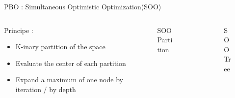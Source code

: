 \begin{frame}{PBO : Simultaneous Optimistic Optimization(SOO)}
    \begin{columns}[b]
        \begin{column}{0.4\textwidth}
            \begin{block}{Principe :}
                \begin{itemize}
                    \item K-inary partition of the space
                    \item Evaluate the center of each partition
                    \item Expand a maximum of one node by iteration / by depth
                \end{itemize}
            \end{block}\vspace*{35pt}
            
        \end{column}    

        \begin{column}[b]{0.27\textwidth}
            \begin{figure}[h]
                \centering
                \resizebox{\textwidth}{!}{
                    
                }
                \caption{SOO Partition}
            \end{figure}
        \end{column}

        \begin{column}[b]{0.33\textwidth}
            \begin{figure}[h]
                \centering
                \resizebox{\textwidth}{!}{
                    
                }
                \caption{SOO Tree}
            \end{figure}
        \end{column}
    \end{columns}
\end{frame}

